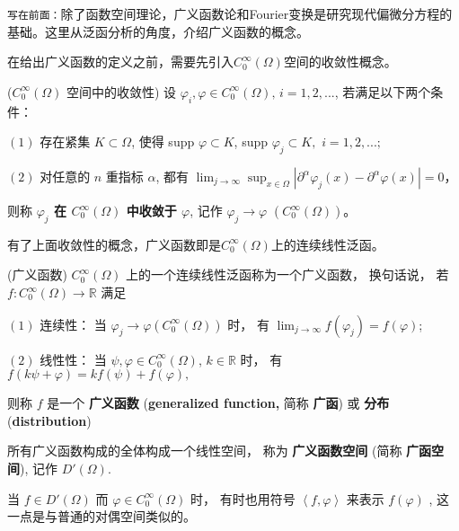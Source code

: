 
\verb`写在前面：`除了函数空间理论，广义函数论和Fourier变换是研究现代偏微分方程的基础。这里从泛函分析的角度，介绍广义函数的概念。

在给出广义函数的定义之前，需要先引入$C_0^\infty(\Omega)$空间的收敛性概念。

\begin{definition}{($C_0^\infty(\Omega)$ 空间中的收敛性)}
设 $\varphi_i,\varphi\in C_0^\infty(\Omega),\,i=1,2,...$,  若满足以下两个条件：

$(1)$ 存在紧集 $K\subset\Omega$, 使得 supp $\varphi\subset K$, supp $\varphi_{j}\subset K,$
$i=1,2,...;$ 

$(2)$ 对任意的 $n$ 重指标 $\alpha$, 都有 ${\displaystyle \lim_{j\rightarrow\infty}{\displaystyle \sup_{x\in\Omega}\left|\partial^{\alpha}\varphi_{j}(x)-\partial^{\alpha}\varphi(x)\right|=0}}$，


则称\textbf{ \textbf{$\varphi_{j}$ 在 $C_{0}^{\infty}(\Omega)$ 中收敛于 $\varphi$}}, 记作 
$\varphi_{j}\rightarrow\varphi$ $(C_{0}^{\infty}(\Omega))$。

\end{definition}

有了上面收敛性的概念，广义函数即是$C_0^\infty(\Omega)$上的连续线性泛函。

\begin{definition}{(广义函数)}
$C_{0}^{\infty}(\Omega)$ 上的一个连续线性泛函称为一个广义函数， 换句话说， 若 $f:C_{0}^{\infty}(\Omega)\rightarrow\mathbb{R}$
满足

$(1)$ 连续性： 当 $\varphi_{j}\rightarrow\varphi(C_{0}^{\infty}(\Omega))$
时， 有 ${\displaystyle \lim_{j\rightarrow\infty}f(\varphi_{j})=f(\varphi)}$; 

$(2)$ 线性性： 当 $\psi,\varphi\in C_{0}^{\infty}(\Omega)$, $k\in\mathbb{R}$
时， 有 $f(k\psi+\varphi)=kf(\psi)+f(\varphi),$

则称 $f$ 是一个 \textbf{广义函数} (\textbf{generalized function,} 简称 \textbf{广函}) 或 \textbf{分布} (\textbf{distribution})

所有广义函数构成的全体构成一个线性空间， 称为 \textbf{广义函数空间} (简称 \textbf{广函空间}), 记作 $D'(\Omega)$. 

当 $f\in D'(\Omega)$ 而 $\varphi\in C^\infty_0(\Omega)$ 时， 有时也用符号 $\left \langle f,\varphi \right \rangle $ 来表示 $f(\varphi)$ , 这一点是与普通的对偶空间类似的。

\end{definition}

